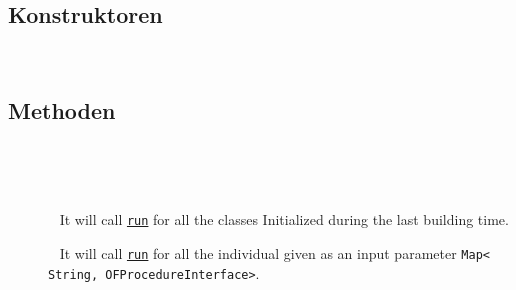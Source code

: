 \subsection{Konstruktoren}
\begin{description}
\item[{\label{ontologyFramework.OFProcedureManagment.OFProcedureBuilder()}}]
~ 
\end{description}
\subsection{Methoden}
\begin{description}
\item[{\label{ontologyFramework.OFProcedureManagment.OFProcedureBuilder.buildInfo(java.lang.String[],ontologyFramework.OFContextManagement.OWLReferences,ontologyFramework.OFRunning.OFInvokingManager.OFBuildedListInvoker)}}]
~ 
\item[{\label{ontologyFramework.OFProcedureManagment.OFProcedureBuilder.getInitialisedClasses()}}]
~ 
\item[{\label{ontologyFramework.OFProcedureManagment.OFProcedureBuilder.runAllProcedure()}}]
~ It will call \texttt{\hyperlink{ontologyFramework.OFProcedureManagment.OFProcedureInterface.run()}{run}} for all the classes
 Initialized during the last building time.
\item[{\label{ontologyFramework.OFProcedureManagment.OFProcedureBuilder.runAllProcedure(java.util.Map<java.lang.String,java.lang.Object>)}}]
~ It will call \texttt{\hyperlink{ontologyFramework.OFProcedureManagment.OFProcedureInterface.run()}{run}} for all the 
 individual given as an input parameter
 \verb!Map< String, OFProcedureInterface>!.
\begin{description}

\end{description}
\end{description}
